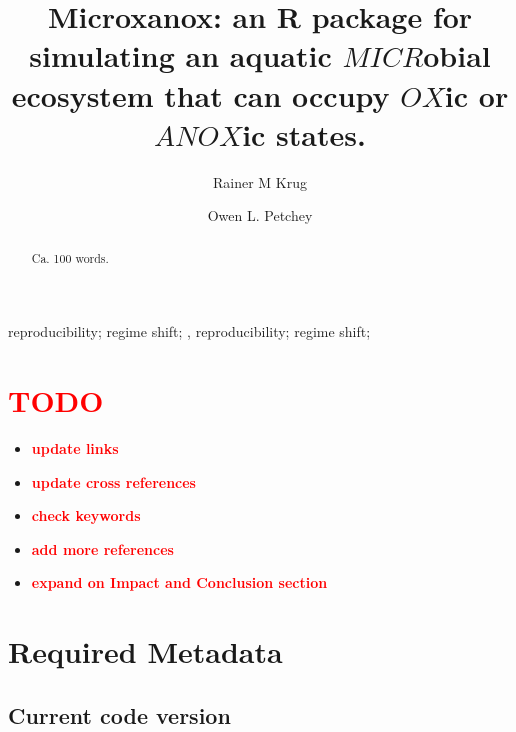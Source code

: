 \documentclass[]{elsarticle} %
\providecommand{\tightlist}{%
  \setlength{\itemsep}{0pt}\setlength{\parskip}{0pt}}
\begin{document}
\begin{frontmatter}

  \title{Microxanox: an R package for simulating an aquatic
\(MICR\)obial ecosystem that can occupy \(OX\)ic or \(ANOX\)ic states.}
    \author[University of Zürich]{Rainer M Krug%
  }
    \author[University of Zürich]{Owen L. Petchey}
  
  \begin{abstract}
  Ca. 100 words.
  \end{abstract}
    \begin{keyword}
    reproducibility; regime shift; \sep 
    reproducibility; regime shift;
  \end{keyword}
  
 \end{frontmatter}

\hypertarget{section}{%
\section{\texorpdfstring{\textcolor{red}{TODO}}{}}\label{section}}

\begin{itemize}
\tightlist
\item
  \textbf{\textcolor{red}{update links}}
\item
  \textbf{\textcolor{red}{update cross references}}
\item
  \textbf{\textcolor{red}{check keywords}}
\item
  \textbf{\textcolor{red}{add more references}}
\item
  \textbf{\textcolor{red}{expand on Impact and Conclusion section}}
  \pagebreak
\end{itemize}

\hypertarget{required-metadata}{%
\section{Required Metadata}\label{required-metadata}}

\hypertarget{current-code-version}{%
\subsection{Current code version}\label{current-code-version}}
\end{document}
